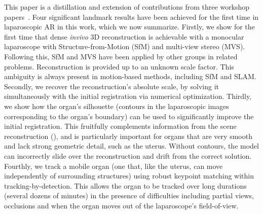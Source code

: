 This paper is a distillation and extension of contributions from three workshop papers~\cite{Collins2044,Collins2013,Collins2017System}. Four significant landmark results have been achieved for the first time in laparoscopic AR in this work, which we now summarize. Firstly, we show for the first time that dense \textit{invivo} 3D reconstruction is achievable with a monocular laparoscope with Structure-from-Motion (SfM) and multi-view stereo (MVS). Following this, SfM and MVS have been applied by other groups in related problems. Reconstruction is provided up to an unknown scale factor. %
This ambiguity is always present in motion-based methods, including SfM and SLAM. %
Secondly, we recover the reconstruction's absolute scale, by solving it simultaneously with the initial registration via numerical optimization. %
Thirdly, we show how the organ's silhouette (contours in the laparoscopic images corresponding to the organ's boundary) can be used to significantly improve the initial registration. This  fruitfully complements information from the scene reconstruction (),  and is particularly important for organs that are very smooth and lack strong geometric detail, such as the uterus. Without contours, the model can incorrectly slide over the reconstruction and drift from the correct solution. Fourthly, we track a mobile organ (one that, like the uterus, can move independently of surrounding structures) using robust keypoint matching within tracking-by-detection. This allows the organ to be tracked over long durations (several dozens of minutes) in the presence of difficulties including partial views, occlusions and when the organ moves out of the laparoscope's field-of-view.


